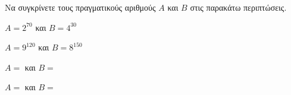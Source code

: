 Να συγκρίνετε τους πραγματικούς αριθμούς $ A $ και $ B $ στις παρακάτω περιπτώσεις.
\begin{alist}
\item $ A=2^{70} $ και $ B=4^{30} $
\item $ A=9^{120} $ και $ B=8^{150} $
\item $ A= $ και $ B= $
\item $ A= $ και $ B= $
\end{alist}
